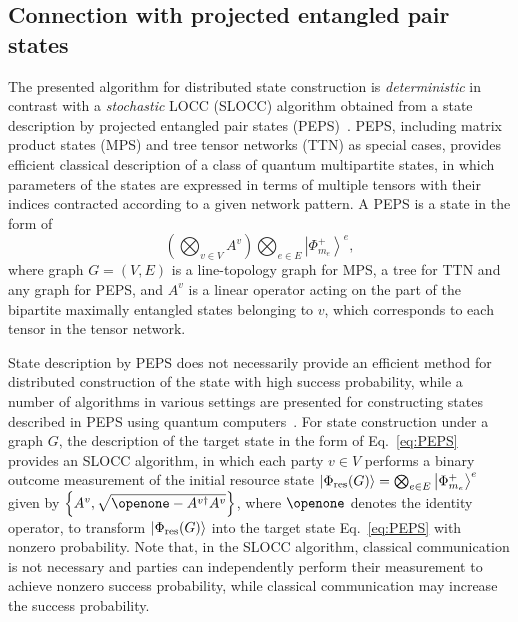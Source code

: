 \documentclass[preprintnumbers,aps,amsmath,amssymb,pra,twocolumn,showpacs,superscriptaddress,floatfix]{revtex4-1}
\def\Ket#1{\left|#1\right\rangle}
\theoremstyle{plain}
\theoremstyle{definition}
\theoremstyle{remark}
\begin{document}
\subsection{Connection with projected entangled pair states}
The presented algorithm for distributed state construction is \textit{deterministic} in contrast with a \textit{stochastic} LOCC (SLOCC) algorithm obtained from a state description by projected entangled pair states (PEPS)~\cite{PEPS}.
PEPS, including matrix product states (MPS) and tree tensor networks (TTN) as special cases, provides efficient classical description of a class of quantum multipartite states,
in which parameters of the states are expressed in terms of multiple tensors with their indices contracted according to a given network pattern.  A PEPS is a state in the form of
\begin{equation}
    \label{eq:PEPS}
    \left(\bigotimes_{v\in V}A^v\right)\bigotimes_{e\in E}\Ket{\Phi_{m_e}^+}^e,
\end{equation}
where graph $G=(V,E)$ is a line-topology graph for MPS, a tree for TTN and any graph for PEPS, and $A^v$ is a linear operator acting on the part of the bipartite maximally entangled states belonging to $v$, which corresponds to each tensor in the tensor network.



State description by PEPS does not necessarily provide an efficient method for distributed construction of the state with high success probability, while a number of algorithms in various settings are presented for constructing states described in PEPS using quantum computers~\cite{PRL110503,PRL110502,PRA032321,PRL080503}.  For state construction under a graph $G$, the description of the target state in the form of Eq.~\eqref{eq:PEPS} provides an SLOCC algorithm, in which each party $v\in V$ performs a binary outcome measurement of the initial resource state $\Ket{\Phi_{\textup{res}}(G)}=\bigotimes_{e\in E}\Ket{\Phi_{m_e}^+}^e$ given by $\left\{A^v, \sqrt{\openone-A^{v\dag} A^v}\right\}$, where $\openone$ denotes the identity operator, to transform $\Ket{\Phi_{\textup{res}}(G)}$ into the target state Eq.~\eqref{eq:PEPS} with nonzero probability.
Note that, in the SLOCC algorithm, classical communication is not necessary and parties can independently perform their measurement to achieve nonzero success probability, while classical communication may increase the success probability.
\end{document}
